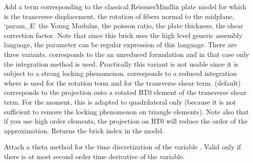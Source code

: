 \documentclass[a4paper,11pt,english]{sphinxmanual}
\begin{document}
\begin{fulllineitems}
\begin{fulllineitems}
Add a term corresponding to the classical Reissner\sphinxhyphen{}Mindlin plate
model for which  is the transverse displacement,
 the rotation of
fibers normal to the midplane, ‘param\_E’ the Young Modulus,
 the poisson ratio,
 the plate thickness,
 the shear correction factor. Note that since this brick
uses the high level generic assembly language, the parameter can
be regular expression of this language.
There are three variants.
 corresponds to the an
unreduced formulation and in that case only the integration
method  is used. Practically this variant is not usable since
it is subject to a strong locking phenomenon.
 corresponds to a reduced integration where  is
used for the rotation term and  for the transverse
shear term.  (default) corresponds to the projection onto
a rotated RT0 element of the transverse shear term. For the moment, this
is adapted to quadrilateral only (because it is not sufficient to
remove the locking phenomenon on triangle elements). Note also that if
you use high order elements, the projection on RT0 will reduce the order
of the approximation.
Returns the brick index in the model.

\end{fulllineitems}


\begin{fulllineitems}
\label{\detokenize{python/cmdref_Model:getfem.Model.add_Newmark_scheme}}
Attach a theta method for the time discretization of the variable
. Valid only if there is at most second order time derivative
of the variable.

\end{fulllineitems}



\end{fulllineitems}
\end{document}
